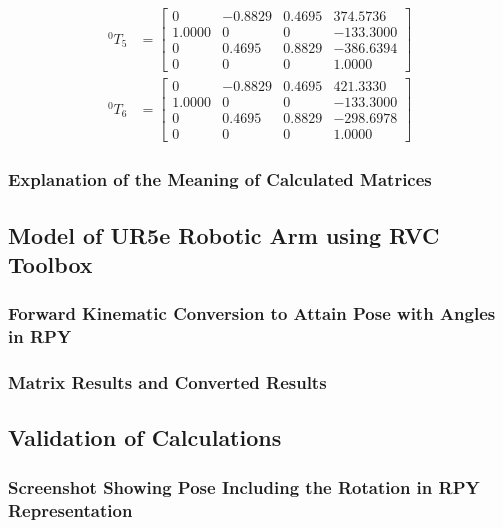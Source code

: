 \begin{equation*}
\begin{split}
        ^{0}T_{5} & = \begin{bmatrix}
                          0      & -0.8829 & 0.4695 & 374.5736  \\
                          1.0000 & 0       & 0      & -133.3000 \\
                          0      & 0.4695  & 0.8829 & -386.6394 \\
                          0      & 0       & 0      & 1.0000
                      \end{bmatrix}   \\
        ^{0}T_{6} & = \begin{bmatrix}
                          0      & -0.8829 & 0.4695 & 421.3330  \\
                          1.0000 & 0       & 0      & -133.3000 \\
                          0      & 0.4695  & 0.8829 & -298.6978 \\
                          0      & 0       & 0      & 1.0000
                      \end{bmatrix}
    \end{split}
\end{equation*}
\subsubsection{Explanation of the Meaning of Calculated Matrices}



\subsection{Model of UR5e Robotic Arm using RVC Toolbox}
\subsubsection{Forward Kinematic Conversion to Attain Pose with Angles in RPY}
\subsubsection{Matrix Results and Converted Results}
\subsection{Validation of Calculations}
\subsubsection{Screenshot Showing Pose Including the Rotation in RPY Representation}
